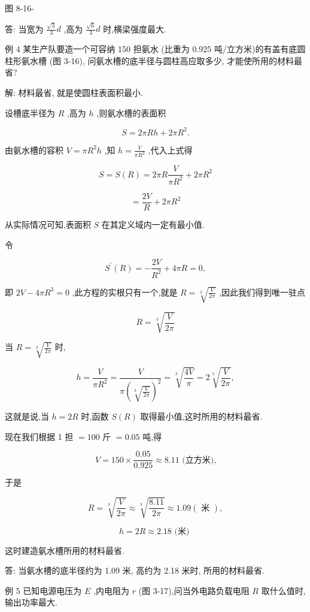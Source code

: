 \documentclass[lang=cn,newtx,12pt,scheme=chinese]{elegantbook}
\begin{document}
图 8-16-

答: 当宽为 \(\frac{\sqrt{3}}{3}d\) ,高为 \(\frac{\sqrt{6}}{3}d\) 时,横梁强度最大.

例 4 某生产队要造一个可容纳 150 担氨水 (比重为 0.925 吨/立方米)的有盖有底圆柱形氨水槽 (图 3-16), 问氨水槽的底半径与圆柱高应取多少, 才能使所用的材料最省?

解: 材料最省, 就是使圆柱表面积最小.

设槽底半径为 \(R\) ,高为 \(h\) ,则氨水槽的表面积

\[
S = {2\pi Rh} + {2\pi }{R}^{2}.
\]

由氨水槽的容积 \(V = \pi {R}^{2}h\) ,知 \(h = \frac{V}{\pi {R}^{2}}\) ,代入上式得

\[
S = S\left( R\right) = {2\pi R}\frac{V}{\pi {R}^{2}} + {2\pi }{R}^{2}
\]

\[
= \frac{2V}{R} + {2\pi }{R}^{2}
\]

从实际情况可知,表面积 \(S\) 在其定义域内一定有最小值.

令

\[
{S}^{\prime }\left( R\right) = - \frac{2V}{{R}^{2}} + {4\pi R} = 0,
\]

即 \({2V} - {4\pi }{R}^{3} = 0\) ,此方程的实根只有一个,就是 \(R = \sqrt[3]{\frac{V}{2\pi }}\) ,因此我们得到唯一驻点

\[
R = \sqrt[3]{\frac{V}{2\pi }}
\]

当 \(R = \sqrt[3]{\frac{V}{2\pi }}\) 时,

\[
h = \frac{V}{\pi {R}^{2}} = \frac{V}{\pi {\left( \sqrt[3]{\frac{V}{2\pi }}\right) }^{2}} = \sqrt[3]{\frac{4V}{\pi }} = 2\sqrt[3]{\frac{V}{2\pi }},
\]

这就是说,当 \(h = {2R}\) 时,函数 \(S\left( R\right)\) 取得最小值,这时所用的材料最省.

现在我们根据 1 担 \(= {100}\) 斤 \(= {0.05}\) 吨,得

\[
V = {150} \times \frac{0.05}{0.925} \approx {8.11}\text{ (立方米),}
\]

于是

\[
R = \sqrt[3]{\frac{V}{2\pi }} \approx \sqrt[3]{\frac{8.11}{2\pi }} \approx {1.09}\left( \text{ 米 }\right) ,
\]

\[
h = {2R} \approx {2.18}\text{ (米) }
\]

这时建造氨水槽所用的材料最省.

答: 当氨水槽的底半径约为 1.09 米, 高约为 2.18 米时, 所用的材料最省.

例 5 已知电源电压为 \(E\) ,内电阻为 \(r\) (图 3-17),问当外电路负载电阻 \(R\) 取什么值时,输出功率最大.
\end{document}
